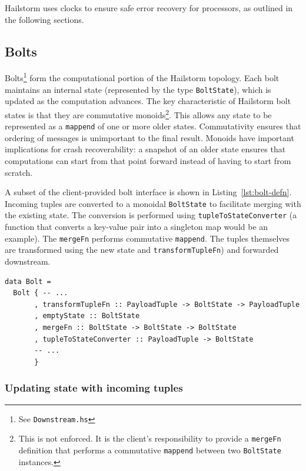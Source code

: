 \documentclass[10pt,nocopyrightspace]{sigplanconf}
\begin{document}
Hailstorm uses clocks to ensure safe error recovery for processors, 
as outlined in the following sections.

\subsection{Bolts}
\label{sec:bolts}

Bolts\footnote{See \texttt{Downstream.hs}} form the computational portion of
the Hailstorm topology. Each bolt maintains an internal state (represented by
the type \lstinline{BoltState}), which is updated as the computation advances.
The key characteristic of Hailstorm bolt states is that they are commutative
monoids\footnote{This is not enforced. It is the client's responsibility to
  provide a \lstinline{mergeFn} definition that performs a commutative
  \lstinline{mappend} between two \lstinline{BoltState} instances.}.  This
  allows any state to be represented as a \lstinline{mappend} of one or more
  older states. Commutativity ensures that ordering of messages is unimportant
  to the final result. Monoids have important implications for crash recoverability:
  a snapshot of an older state ensures that computations can start 
  from that point forward instead of having to start from scratch.

A subset of the client-provided bolt interface is shown in
Listing~\ref{lst:bolt-defn}. Incoming tuples are converted to a monoidal
\lstinline{BoltState} to facilitate merging with the existing state. The
conversion is performed using \lstinline{tupleToStateConverter} (a function
that converts a key-value pair into a singleton map would be an example). The
\lstinline{mergeFn} performs commutative \lstinline{mappend}. The tuples
themselves are transformed using the new state and
\lstinline{transformTupleFn}) and forwarded downstream.

\begin{lstlisting}[caption=Client interface for a
bolt,label=lst:bolt-defn,float]
data Bolt =
  Bolt { -- ...
       , transformTupleFn :: PayloadTuple -> BoltState -> PayloadTuple
       , emptyState :: BoltState
       , mergeFn :: BoltState -> BoltState -> BoltState
       , tupleToStateConverter :: PayloadTuple -> BoltState
       -- ...
       }
\end{lstlisting}

\subsubsection{Updating state with incoming tuples}
\label{sec:updating-state}
\end{document}
